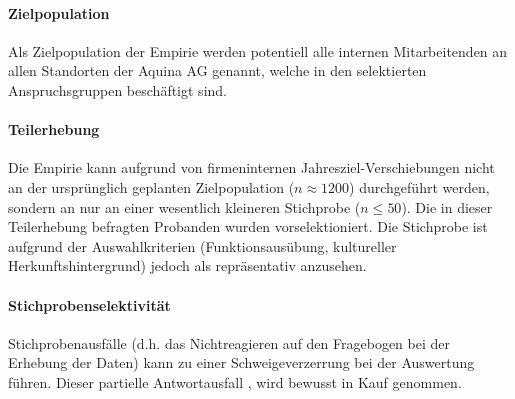 \documentclass[../../main.tex]{subfiles}
\begin{document}
\paragraph*{Zielpopulation}\mbox{}

\begin{sloppypar}
Als Zielpopulation der Empirie werden potentiell alle internen Mitarbeitenden an allen Standorten der Aquina AG genannt, welche in den selektierten Anspruchsgruppen beschäftigt sind.
\end{sloppypar}

\paragraph*{Teilerhebung}\mbox{}

\begin{sloppypar}
Die Empirie kann aufgrund von firmeninternen Jahresziel-Verschiebungen nicht an der ursprünglich geplanten Zielpopulation ($n \approx 1200$) durchgeführt werden, sondern an nur an einer wesentlich kleineren Stichprobe ($n \leq 50$). Die in dieser Teilerhebung befragten Probanden wurden vorselektioniert. Die Stichprobe ist aufgrund der Auswahlkriterien (Funktionsausübung, kultureller Herkunftshintergrund) jedoch als repräsentativ anzusehen.
\end{sloppypar}

\paragraph*{Stichprobenselektivität}\mbox{}

\begin{sloppypar}
Stichprobenausfälle (d.h. das Nichtreagieren auf den Fragebogen bei der Erhebung der Daten) kann zu einer Schweigeverzerrung bei der Auswertung führen. Dieser partielle Antwortausfall , wird bewusst in Kauf genommen. 
\end{sloppypar}
\end{document}

